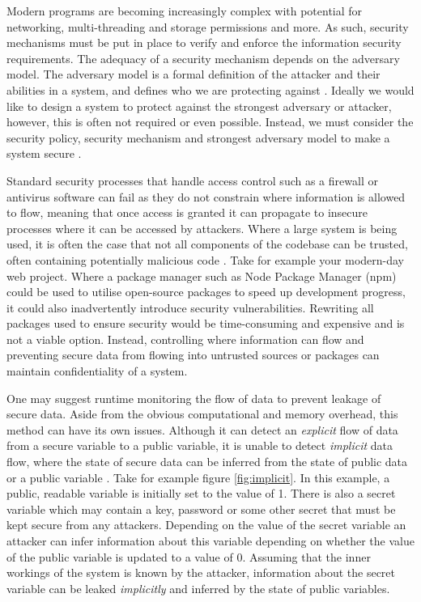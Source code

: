 \documentclass[twocolumn]{article}
\begin{document}
Modern programs are becoming increasingly complex with potential for networking, multi-threading and storage permissions and more. As such, security mechanisms must be put in place to verify and enforce the information security requirements. The adequacy of a security mechanism depends on the adversary model. The adversary model is a formal definition of the attacker and their abilities in a system, and defines who we are protecting against \cite{do2019role}. Ideally we would like to design a system to protect against the strongest adversary or attacker, however, this is often not required or even possible. Instead, we must consider the security policy, security mechanism and strongest adversary model to make a system secure \cite{balliu2014logics}.

Standard security processes that handle access control such as a firewall or antivirus software can fail as they do not constrain where information is allowed to flow, meaning that once access is granted it can propagate to insecure processes where it can be accessed by attackers. Where a large system is being used, it is often the case that not all components of the codebase can be trusted, often containing potentially malicious code \cite{sabelfeld2003language}. Take for example your modern-day web project. Where a package manager such as Node Package Manager (npm) could be used to utilise open-source packages to speed up development progress, it could also inadvertently introduce security vulnerabilities. Rewriting all packages used to ensure security would be time-consuming and expensive and is not a viable option. Instead, controlling where information can flow and preventing secure data from flowing into untrusted sources or packages can maintain confidentiality of a system.

One may suggest runtime monitoring the flow of data to prevent leakage of secure data. Aside from the obvious computational and memory overhead, this method can have its own issues. Although it can detect an \textit{explicit} flow of data from a secure variable to a public variable, it is unable to detect \textit{implicit} data flow, where the state of secure data can be inferred from the state of public data or a public variable \cite{denning1977certification}. Take for example figure \ref{fig:implicit}. In this example, a public, readable variable is initially set to the value of 1. There is also a secret variable which may contain a key, password or some other secret that must be kept secure from any attackers. Depending on the value of the secret variable an attacker can infer information about this variable depending on whether the value of the public variable is updated to a value of 0. Assuming that the inner workings of the system is known by the attacker, information about the secret variable can be leaked \textit{implicitly} and inferred by the state of public variables.
\end{document}
